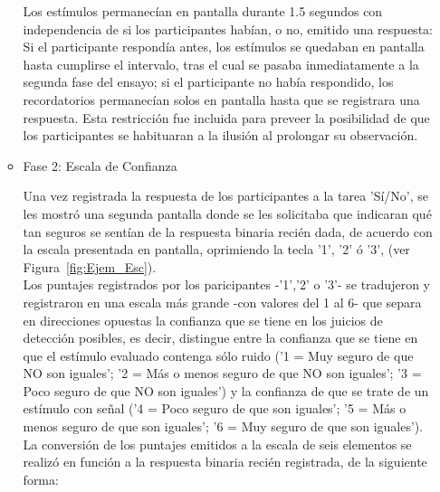 \begin{itemize}
\begin{itemize}
Los estímulos permanecían en pantalla durante 1.5 segundos con independencia de si los participantes habían, o no, emitido una respuesta: Si el participante respondía antes, los estímulos se quedaban en pantalla hasta cumplirse el intervalo, tras el cual se pasaba inmediatamente a la segunda fase del ensayo; si el participante no había respondido, los recordatorios permanecían solos en pantalla hasta que se registrara una respuesta. Esta restricción fue incluida para preveer la posibilidad de que los participantes se habituaran a la ilusión al prolongar su observación.\\

\item Fase 2: Escala de Confianza

Una vez registrada la respuesta de los participantes a la tarea 'Sí/No', se les mostró una segunda pantalla donde se les solicitaba que indicaran qué tan seguros se sentían de la respuesta binaria recién dada, de acuerdo con la escala presentada en pantalla, oprimiendo la tecla '1', '2' ó '3', (ver Figura~\ref{fig:Ejem_Esc}). \\

Los puntajes registrados por los paricipantes -'1','2' o '3'- se tradujeron y registraron en una escala más grande -con valores del 1 al 6- que separa en direcciones opuestas la confianza que se tiene en los juicios de detección posibles, es decir, distingue entre la confianza que se tiene en que el estímulo evaluado contenga sólo ruido ('1 = Muy seguro de que NO son iguales'; '2 =  Más o menos seguro de que NO son iguales'; '3 = Poco seguro de que NO son iguales') y la confianza de que se trate de un estímulo con señal ('4 = Poco seguro de que son iguales'; '5 = Más o menos seguro de que son iguales'; '6 = Muy seguro de que son iguales'). La conversión de los puntajes emitidos a la escala de seis elementos se realizó en función a la respuesta binaria recién registrada, de la siguiente forma:


\end{itemize}
\end{itemize}
